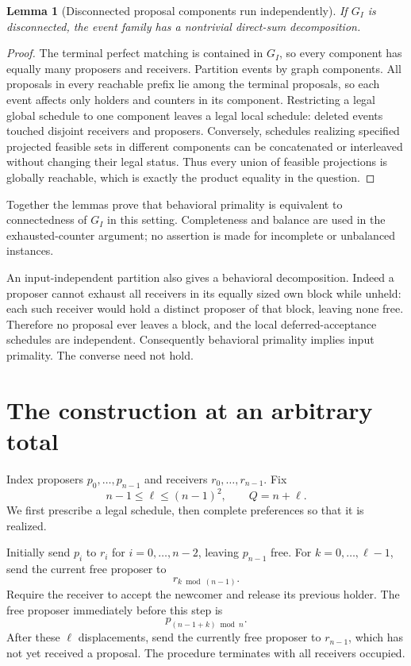 \documentclass[11pt,a4paper]{article}
\newtheorem{lemma}[theorem]{Lemma}
\begin{document}
\begin{lemma}[Disconnected proposal components run independently]
If $G_I$ is disconnected, the event family has a nontrivial direct-sum decomposition.
\end{lemma}
\begin{proof}
The terminal perfect matching is contained in $G_I$, so every component has equally many proposers and receivers. Partition events by graph components. All proposals in every reachable prefix lie among the terminal proposals, so each event affects only holders and counters in its component. Restricting a legal global schedule to one component leaves a legal local schedule: deleted events touched disjoint receivers and proposers. Conversely, schedules realizing specified projected feasible sets in different components can be concatenated or interleaved without changing their legal status. Thus every union of feasible projections is globally reachable, which is exactly the product equality in the question.
\end{proof}

Together the lemmas prove that behavioral primality is equivalent to connectedness of $G_I$ in this setting. Completeness and balance are used in the exhausted-counter argument; no assertion is made for incomplete or unbalanced instances.

An input-independent partition also gives a behavioral decomposition. Indeed a proposer cannot exhaust all receivers in its equally sized own block while unheld: each such receiver would hold a distinct proposer of that block, leaving none free. Therefore no proposal ever leaves a block, and the local deferred-acceptance schedules are independent. Consequently behavioral primality implies input primality. The converse need not hold.

\section{The construction at an arbitrary total}
Index proposers $p_0,\ldots,p_{n-1}$ and receivers $r_0,\ldots,r_{n-1}$. Fix
\[
 n-1\le\ell\le(n-1)^2,
 \qquad Q=n+\ell.                                        \tag{1}
\]
We first prescribe a legal schedule, then complete preferences so that it is realized.

Initially send $p_i$ to $r_i$ for $i=0,\ldots,n-2$, leaving $p_{n-1}$ free. For $k=0,\ldots,\ell-1$, send the current free proposer to
\[
 r_{k\bmod(n-1)}.
\]
Require the receiver to accept the newcomer and release its previous holder. The free proposer immediately before this step is
\[
 p_{(n-1+k)\bmod n}.                                    \tag{2}
\]
After these $\ell$ displacements, send the currently free proposer to $r_{n-1}$, which has not yet received a proposal. The procedure terminates with all receivers occupied.
\end{document}
